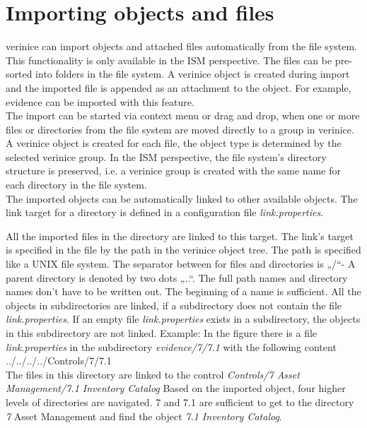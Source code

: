 \documentclass[a4paper,10pt]{book}
\begin{document}
\section{Importing objects and files} \label{Importing objects and files}
verinice can import objects and attached files automatically from the file system. This functionality is only available in the ISM perspective.
The files can be pre-sorted into folders in the file system. A verinice object is created during import and the imported file is appended as an
attachment to the object. For example, evidence can be imported with this feature.
\newline\\
The import can be started via context menu or drag and drop, when one or more files or directories from the file system are moved directly to
a group in verinice. A verinice object is created for each file, the object type is determined by the selected verinice group. In the ISM perspective,
the file system's directory structure is preserved, i.e. a verinice group is created with the same name for each directory in the file system.
\newline\\
The imported objects can be automatically linked to other available objects. The link target for a directory is defined in a configuration file \textit{link.properties}.

All the imported files in the directory are linked to this target. The link’s target is specified in the file by the path in the verinice object tree.
The path is specified like a UNIX file system. The separator between for files and directories is „/“- A parent directory is denoted by two dots „..“.
The full path names and directory names don’t have to be written out. The beginning of a name is sufficient. All the objects in subdirectories are linked,
if a subdirectory does not contain the file \textit{link.properties}. If an empty file \textit{link.properties} exists in a subdirectory, the objects in this subdirectory are not linked.
Example: In the figure there is a file \textit{link.properties} in the subdirectory \textit{evidence/7/7.1} with the following content
\newline\\
../../../../Controls/7/7.1
\newline\\
The files in this directory are linked to the control \textit{Controls/7 Asset Management/7.1 Inventory Catalog}
Based on the imported object, four higher levels of directories are navigated.
7 and 7.1 are sufficient to get to the directory \textit{7} Asset Management and find the object \textit{7.1 Inventory Catalog}.
\end{document}
